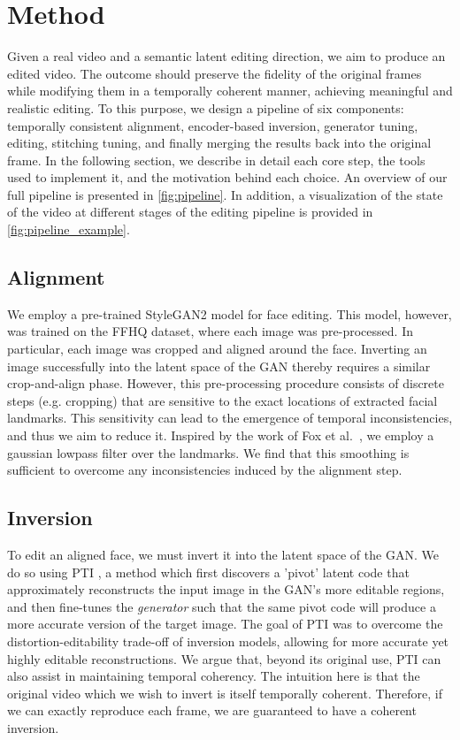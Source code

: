 


\section{Method}



Given a real video and a semantic latent editing direction, we aim to produce an edited video. The outcome should preserve the fidelity of the original frames while modifying them in a temporally coherent manner, achieving meaningful and realistic editing.
To this purpose, we design a pipeline of six components: temporally consistent alignment, encoder-based inversion, generator tuning, editing, stitching tuning, and finally merging the results back into the original frame. In the following section, we describe in detail each core step, the tools used to implement it, and the motivation behind each choice. An overview of our full pipeline is presented in \cref{fig:pipeline}. In addition, a visualization of the state of the video at different stages of the editing pipeline is provided in \cref{fig:pipeline_example}.

\subsection{Alignment}\label{subsec:alignment} We employ a pre-trained StyleGAN2 model for face editing. This model, however, was trained on the FFHQ dataset, where each image was pre-processed. In particular, each image was cropped and aligned around the face. Inverting an image successfully into the latent space of the GAN thereby requires a similar crop-and-align phase. However, this pre-processing procedure consists of discrete steps (e.g. cropping) that are sensitive to the exact locations of extracted facial landmarks. This sensitivity can lead to the emergence of temporal inconsistencies, and thus we aim to reduce it. Inspired by the work of Fox et al.~, we employ a gaussian lowpass filter over the landmarks. 
We find that this smoothing is sufficient to overcome any inconsistencies induced by the alignment step. 

\subsection{Inversion} To edit an aligned face, we must invert it into the latent space of the GAN. We do so using PTI \cite{roich2021pivotal}, a method which first discovers a 'pivot' latent code that approximately reconstructs the input image in the GAN's more editable regions, and then fine-tunes the \textit{generator} such that the same pivot code will produce a more accurate version of the target image. The goal of PTI was to overcome the distortion-editability trade-off \cite{tov2021designing} of inversion models, allowing for more accurate yet highly editable reconstructions. We argue that, beyond its original use, PTI can also assist in maintaining temporal coherency. The intuition here is that the original video which we wish to invert is itself temporally coherent. Therefore, if we can exactly reproduce each frame, we are guaranteed to have a coherent inversion.

